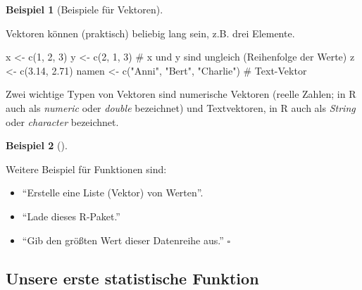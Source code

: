 \documentclass[
  letterpaper,
  twoside,
  open=any]{scrbook}
\newenvironment{Shaded}{\begin{snugshade}}{\end{snugshade}}
\newcommand{\CommentTok}[1]{\textcolor[rgb]{0.37,0.37,0.37}{#1}}
\newcommand{\DecValTok}[1]{\textcolor[rgb]{0.68,0.00,0.00}{#1}}
\newcommand{\FloatTok}[1]{\textcolor[rgb]{0.68,0.00,0.00}{#1}}
\newcommand{\FunctionTok}[1]{\textcolor[rgb]{0.28,0.35,0.67}{#1}}
\newcommand{\NormalTok}[1]{\textcolor[rgb]{0.00,0.23,0.31}{#1}}
\newcommand{\OtherTok}[1]{\textcolor[rgb]{0.00,0.23,0.31}{#1}}
\newcommand{\StringTok}[1]{\textcolor[rgb]{0.13,0.47,0.30}{#1}}
\providecommand{\tightlist}{%
  \setlength{\itemsep}{0pt}\setlength{\parskip}{0pt}}\usepackage{longtable,booktabs,array}
\theoremstyle{definition}
\theoremstyle{definition}
\theoremstyle{definition}
\newtheorem{example}{Beispiel}[chapter]
\theoremstyle{remark}
\begin{document}
\begin{example}[Beispiele für
Vektoren]\protect\hypertarget{exm-vektoren}{}\label{exm-vektoren}

Vektoren können (praktisch) beliebig lang sein, z.B. drei Elemente.

\begin{Shaded}
\begin{Highlighting}[]
\NormalTok{x }\OtherTok{\textless{}{-}} \FunctionTok{c}\NormalTok{(}\DecValTok{1}\NormalTok{, }\DecValTok{2}\NormalTok{, }\DecValTok{3}\NormalTok{)}
\NormalTok{y }\OtherTok{\textless{}{-}} \FunctionTok{c}\NormalTok{(}\DecValTok{2}\NormalTok{, }\DecValTok{1}\NormalTok{, }\DecValTok{3}\NormalTok{)  }\CommentTok{\# x und y sind ungleich (Reihenfolge der Werte)}
\NormalTok{z }\OtherTok{\textless{}{-}} \FunctionTok{c}\NormalTok{(}\FloatTok{3.14}\NormalTok{, }\FloatTok{2.71}\NormalTok{)  }
\NormalTok{namen }\OtherTok{\textless{}{-}} \FunctionTok{c}\NormalTok{(}\StringTok{"Anni"}\NormalTok{, }\StringTok{"Bert"}\NormalTok{, }\StringTok{"Charlie"}\NormalTok{) }\CommentTok{\# Text{-}Vektor}
\end{Highlighting}
\end{Shaded}

\end{example}

Zwei wichtige Typen von Vektoren sind numerische Vektoren (reelle
Zahlen; in R auch als \emph{numeric} oder \emph{double} bezeichnet) und
Textvektoren, in R auch als \emph{String} oder \emph{character}
bezeichnet.

\begin{example}[]\protect\hypertarget{exm-funs}{}\label{exm-funs}

Weitere Beispiel für Funktionen sind:

\begin{itemize}
\tightlist
\item
  \enquote{Erstelle eine Liste (Vektor) von Werten}.
\item
  \enquote{Lade dieses R-Paket.}
\item
  \enquote{Gib den größten Wert dieser Datenreihe aus.} \(\square\)
\end{itemize}

\end{example}

\subsection{Unsere erste statistische Funktion}\label{sec-first-fun}
\end{document}
